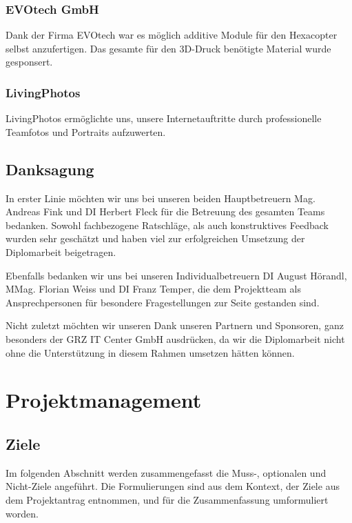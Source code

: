 \subsection*{EVOtech GmbH}
Dank der Firma {EVOtech\cite{evotech}} war es möglich additive Module für den Hexacopter selbst anzufertigen.
Das gesamte für den 3D-Druck benötigte Material wurde gesponsert.

\subsection*{LivingPhotos}
{LivingPhotos\cite{livingphotos}} ermöglichte uns, unsere Internetauftritte durch professionelle Teamfotos und Portraits aufzuwerten.

\section{Danksagung}
In erster Linie möchten wir uns bei unseren beiden Hauptbetreuern Mag. Andreas Fink und DI Herbert Fleck für die
Betreuung des gesamten Teams bedanken. Sowohl fachbezogene Ratschläge, als auch konstruktives Feedback wurden sehr
geschätzt und haben viel zur erfolgreichen Umsetzung der Diplomarbeit beigetragen.

Ebenfalls bedanken wir uns bei unseren Individualbetreuern DI August Hörandl, MMag. Florian Weiss und
DI Franz Temper, die dem Projektteam als Ansprechpersonen für besondere Fragestellungen zur Seite gestanden
sind.

Nicht zuletzt möchten wir unseren Dank unseren Partnern und Sponsoren, ganz besonders der GRZ IT Center GmbH
ausdrücken, da wir die Diplomarbeit nicht ohne die Unterstützung in diesem Rahmen umsetzen hätten können.

\chapter{Projektmanagement}
\renewcommand{\kapitelautor}{Autor: Markus Kaiser}

\section{Ziele}
Im folgenden Abschnitt werden zusammengefasst die Muss-, optionalen und Nicht-Ziele angeführt.
Die Formulierungen sind aus dem Kontext, der Ziele aus dem Projektantrag entnommen, und für die
Zusammenfassung umformuliert worden.

